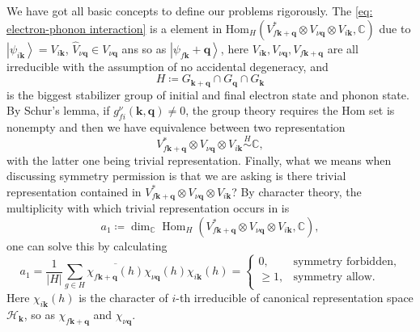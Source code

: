 \documentclass[11pt, reqno]{amsart}
\theoremstyle{definition}
\theoremstyle{remark}
\begin{document}
We have got all basic concepts to define our problems rigorously. The \eqref{eq: electron-phonon interaction} is a element in $\mathrm{Hom}_H\left( V_{f\mathbf{k}+\mathbf{q}}^{*}\otimes V_{\nu\mathbf{q}}\otimes V_{i\mathbf{k}},\mathbb{C} \right)$ due to $\left| \psi _{i\mathbf{k}} \right> =V_{i\mathbf{k}}$, $\hat{V}_{\nu \mathbf{q}}\in V_{\nu\mathbf{q}}$ ans so as $\left| \psi _{f\mathbf{k}}+\mathbf{q} \right>$, here $V_{i\mathbf{k}},V_{\nu \mathbf{q}},V_{f\mathbf{k}+\mathbf{q}}$ are all irreducible with the assumption of no accidental degeneracy, and
\begin{equation}\label{eq: H}
    H\coloneqq G_{\mathbf{k}+\mathbf{q}}\cap G_{\mathbf{q}}\cap G_{\mathbf{k}}
\end{equation}
is the biggest stabilizer group of initial and final electron state and phonon state. By Schur's lemma, if $g_{fi}^{\nu}\left( \mathbf{k},\mathbf{q} \right) \ne 0$, the group theory requires the Hom set is nonempty and then we have equivalence between two representation
\begin{equation}
    V_{f\mathbf{k}+\mathbf{q}}^{*}\otimes V_{\nu \mathbf{q}}\otimes V_{i\mathbf{k}}\overset{H}{\sim}\mathbb{C},
\end{equation}
with the latter one being trivial representation. Finally, what we means when discussing symmetry permission is that we are asking is there trivial representation contained in $V_{f\mathbf{k}+\mathbf{q}}^{*}\otimes V_{\nu \mathbf{q}}\otimes V_{i\mathbf{k}}$? By character theory, the multiplicity with which trivial representation occurs in is
\begin{equation}
    a_1\coloneqq \dim_{\mathbb{C}}\operatorname{Hom}_H\left( V_{f\mathbf{k}+\mathbf{q}}^{*}\otimes V_{\nu \mathbf{q}}\otimes V_{i\mathbf{k}},\mathbb{C} \right),
\end{equation}
one can solve this by calculating
\begin{equation}
    a_1=\frac{1}{\left| H \right|}\sum_{g\in H}{\overline{\chi _{f\mathbf{k}+\mathbf{q}}\left( h \right) }\chi _{\nu \mathbf{q}}\left( h \right) \chi _{i\mathbf{k}}\left( h \right)}=\begin{cases}
	0,&		\text{symmetry forbidden},\\
	\geq 1,&		\text{symmetry allow}.\\
\end{cases}
\end{equation}
Here $\chi _{i\mathbf{k}}\left( h \right)$ is the character of $i$-th irreducible of canonical representation space $\mathcal{H}_\mathbf{k}$, so as $\chi _{f\mathbf{k}+\mathbf{q}}$ and $\chi _{\nu \mathbf{q}}$.
\end{document}
